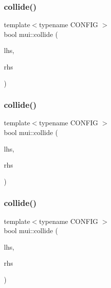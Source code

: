 \mbox{\label{namespacemui_a6765d7d1e0d21768dcaa16aab09db723}} 
\subsubsection{\texorpdfstring{collide()}{collide()}\hspace{0.1cm}{\footnotesize\ttfamily [1/3]}}
{\footnotesize\ttfamily template$<$typename C\+O\+N\+F\+IG $>$ \\
bool mui\+::collide (\begin{DoxyParamCaption}\item[{const \hyperlink{classmui_1_1span}{span}$<$ C\+O\+N\+F\+IG $>$ \&}]{lhs,  }\item[{const \hyperlink{classmui_1_1span}{span}$<$ C\+O\+N\+F\+IG $>$ \&}]{rhs }\end{DoxyParamCaption})}

\mbox{\label{namespacemui_a18f0ce044f4f39a91b259dd50361825f}} 
\subsubsection{\texorpdfstring{collide()}{collide()}\hspace{0.1cm}{\footnotesize\ttfamily [2/3]}}
{\footnotesize\ttfamily template$<$typename C\+O\+N\+F\+IG $>$ \\
bool mui\+::collide (\begin{DoxyParamCaption}\item[{const \hyperlink{classmui_1_1geometry_1_1any__shape}{geometry\+::any\+\_\+shape}$<$ C\+O\+N\+F\+IG $>$ \&}]{lhs,  }\item[{const \hyperlink{classmui_1_1span}{span}$<$ C\+O\+N\+F\+IG $>$ \&}]{rhs }\end{DoxyParamCaption})}

\mbox{\label{namespacemui_ad6de60c5a3b20c2a0733b19512cf2428}} 
\subsubsection{\texorpdfstring{collide()}{collide()}\hspace{0.1cm}{\footnotesize\ttfamily [3/3]}}
{\footnotesize\ttfamily template$<$typename C\+O\+N\+F\+IG $>$ \\
bool mui\+::collide (\begin{DoxyParamCaption}\item[{const \hyperlink{classmui_1_1span}{span}$<$ C\+O\+N\+F\+IG $>$ \&}]{lhs,  }\item[{const \hyperlink{classmui_1_1geometry_1_1any__shape}{geometry\+::any\+\_\+shape}$<$ C\+O\+N\+F\+IG $>$ \&}]{rhs }\end{DoxyParamCaption})}

